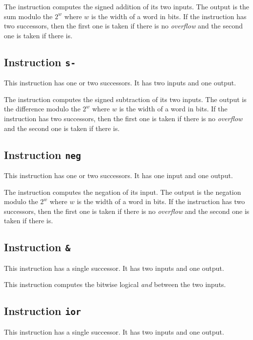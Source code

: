 The instruction computes the signed addition of its two inputs.  The
output is the sum modulo the $2^w$ where $w$ is the width of a word in
bits.  If the instruction has two successors, then the first one is
taken if there is no \emph{overflow} and the second one is taken if
there is.  

\subsection{Instruction \texttt{s-}}
\label{mir-instruction-s-}

This instruction has one or two successors.  It has two inputs and one
output.

The instruction computes the signed subtraction of its two inputs.
The output is the difference modulo the $2^w$ where $w$ is the width
of a word in bits.  If the instruction has two successors, then the
first one is taken if there is no \emph{overflow} and the second one
is taken if there is.

\subsection{Instruction \texttt{neg}}
\label{mir-instruction-neg}

This instruction has one or two successors.  It has one input and one
output.

The instruction computes the negation of its input.  The output is the
negation modulo the $2^w$ where $w$ is the width of a word in bits.
If the instruction has two successors, then the first one is taken if
there is no \emph{overflow} and the second one is taken if there is.

\subsection{Instruction \texttt{\&}}
\label{mir-instruction-and}

This instruction has a single successor.  It has two inputs and one
output. 

This instruction computes the bitwise logical \emph{and} between the
two inputs. 

\subsection{Instruction \texttt{ior}}
\label{mir-instruction-ior}

This instruction has a single successor.  It has two inputs and one
output. 

